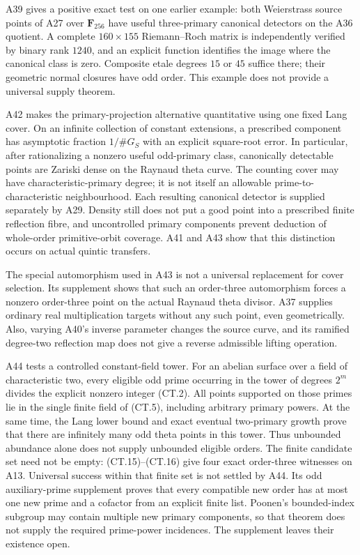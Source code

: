 \documentclass[11pt,a4paper]{article}
\begin{document}
A39 gives a positive exact test on one earlier example: both
Weierstrass source points of A27 over $\mathbf F_{256}$ have useful
three-primary canonical detectors on the A36 quotient. A complete
$160\times155$ Riemann--Roch matrix is independently verified by
binary rank $1240$, and an explicit function identifies the image
where the canonical class is zero. Composite etale degrees $15$ or
$45$ suffice there; their geometric normal closures have odd order.
This example does not provide a universal supply theorem.


A42 makes the primary-projection alternative quantitative using one
fixed Lang cover. On an infinite collection of constant extensions, a
prescribed component has asymptotic fraction $1/\#G_S$ with an explicit
square-root error. In particular, after rationalizing a nonzero useful
odd-primary class, canonically detectable points are Zariski dense on
the Raynaud theta curve. The counting cover may have characteristic-primary
degree; it is not itself an allowable prime-to-characteristic
neighbourhood. Each resulting canonical detector is supplied separately
by A29. Density still does not put a good point into a prescribed finite
reflection fibre, and uncontrolled primary components prevent deduction
of whole-order primitive-orbit coverage. A41 and A43 show that this
distinction occurs on actual quintic transfers.


The special automorphism used in A43 is not a universal replacement
for cover selection. Its supplement shows that such an order-three
automorphism forces a nonzero order-three point on the actual Raynaud
theta divisor. A37 supplies ordinary real multiplication targets
without any such point, even geometrically. Also, varying A40's inverse
parameter changes the source curve, and its ramified degree-two
reflection map does not give a reverse admissible lifting operation.

A44 tests a controlled constant-field tower. For an abelian surface over
a field of characteristic two, every eligible odd prime occurring in
the tower of degrees $2^m$ divides the explicit nonzero integer (CT.2).
All points supported on those primes lie in the single finite field
of (CT.5), including arbitrary primary powers. At the same time,
the Lang lower bound and exact eventual two-primary growth prove that
there are infinitely many odd theta points in this tower. Thus
unbounded abundance alone does not supply unbounded eligible orders.
The finite candidate set need not be empty: (CT.15)--(CT.16) give
four exact order-three witnesses on A13. Universal success within that finite set is not settled by A44. Its
odd auxiliary-prime supplement proves that every compatible new order
has at most one new prime and a cofactor from an explicit finite list.
Poonen's bounded-index subgroup may contain multiple new primary
components, so that theorem does not supply the required prime-power
incidences. The supplement leaves their existence open.
\end{document}
